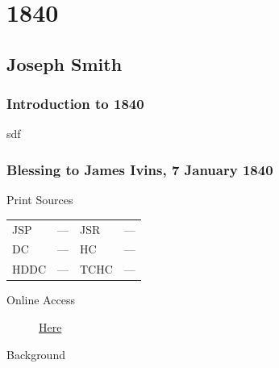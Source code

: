 \section{1840}

	\subsection{Joseph Smith}
		\label{EMS-1840-JS}

		\subsubsection{Introduction to 1840}
		
			sdf
			
		\subsubsection{Blessing to James Ivins, 7 January 1840}
			\label{EMS-1840-JS-7-JAN-1840}
			
			\begin{description}
				\item[Print Sources]
			\end{description}

			\begin{tabular}{p{0.5in}p{1in}p{0.5in}p{1in}}
				JSP	 	& ---		& JSR 		& --- \\
				DC	 	& ---		& HC 		& --- \\
				HDDC 	& ---		& TCHC 		& --- \\
			\end{tabular}
			
			\begin{description}
				\item[Online Access] \href{https://www.josephsmithpapers.org/paper-summary/blessing-to-james-ivins-7-january-1840/1}{Here}
			\end{description}
			
			\begin{description}
				\item[Background]
			\end{description}
			
